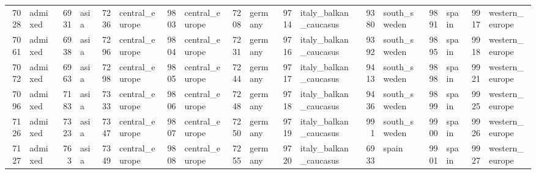 \begin{table}[h]
{\begin{tabular}{rl|rl|rl|rl|rl|rl|rl|rl|rl}
			7028                   & admixed         & 6931                   & asia            & 7236                   & central\_europe & 9803                   & central\_europe & 7208                   & germany                 & 9714                   & italy\_balkan\_caucasus & 9380                   & south\_sweden   & 9891                   & spain           & \multicolumn{1}{r}{9917} & western\_europe \\
			7061                   & admixed         & 6938                   & asia            & 7296                   & central\_europe & 9804                   & central\_europe & 7231                   & germany                 & 9716                   & italy\_balkan\_caucasus & 9392                   & south\_sweden   & 9895                   & spain           & \multicolumn{1}{r}{9918} & western\_europe \\
			7072                   & admixed         & 6963                   & asia            & 7298                   & central\_europe & 9805                   & central\_europe & 7244                   & germany                 & 9717                   & italy\_balkan\_caucasus & 9413                   & south\_sweden   & 9898                   & spain           & \multicolumn{1}{r}{9921} & western\_europe \\
			7096                   & admixed         & 7183                   & asia            & 7333                   & central\_europe & 9806                   & central\_europe & 7248                   & germany                 & 9718                   & italy\_balkan\_caucasus & 9436                   & south\_sweden   & 9899                   & spain           & \multicolumn{1}{r}{9925} & western\_europe \\
			7126                   & admixed         & 7323                   & asia            & 7347                   & central\_europe & 9807                   & central\_europe & 7250                   & germany                 & 9719                   & italy\_balkan\_caucasus & 991                    & south\_sweden   & 9900                   & spain           & \multicolumn{1}{r}{9926} & western\_europe \\
			7127                   & admixed         & 763                    & asia            & 7349                   & central\_europe & 9808                   & central\_europe & 7255                   & germany                 & 9720                   & italy\_balkan\_caucasus & 6933                   & spain           & 9901                   & spain           & \multicolumn{1}{r}{9927} & western\_europe \\

\end{tabular}}
\end{table}
